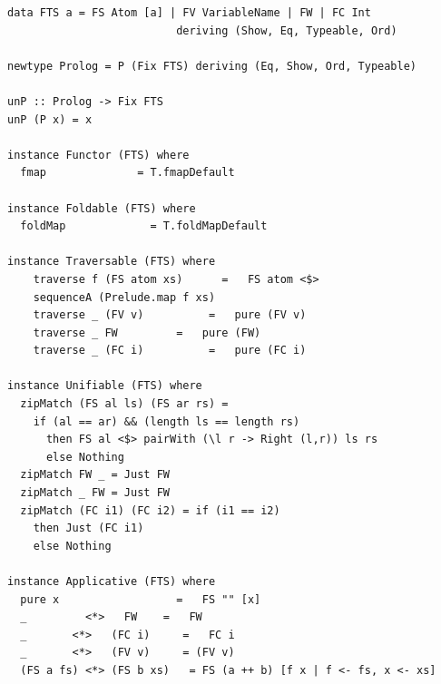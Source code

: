 \documentclass[thesis-solanki.tex]{subfiles}
\begin{document}
\begin{verbatim}
data FTS a = FS Atom [a] | FV VariableName | FW | FC Int
                          deriving (Show, Eq, Typeable, Ord)

newtype Prolog = P (Fix FTS) deriving (Eq, Show, Ord, Typeable)

unP :: Prolog -> Fix FTS
unP (P x) = x

instance Functor (FTS) where
  fmap              = T.fmapDefault

instance Foldable (FTS) where
  foldMap             = T.foldMapDefault

instance Traversable (FTS) where
    traverse f (FS atom xs)      =   FS atom <$>
    sequenceA (Prelude.map f xs)
    traverse _ (FV v)          =   pure (FV v)
    traverse _ FW         =   pure (FW)
    traverse _ (FC i)          =   pure (FC i)

instance Unifiable (FTS) where
  zipMatch (FS al ls) (FS ar rs) =
    if (al == ar) && (length ls == length rs)
      then FS al <$> pairWith (\l r -> Right (l,r)) ls rs
      else Nothing
  zipMatch FW _ = Just FW
  zipMatch _ FW = Just FW
  zipMatch (FC i1) (FC i2) = if (i1 == i2)
    then Just (FC i1)
    else Nothing

instance Applicative (FTS) where
  pure x                  =   FS "" [x]
  _         <*>   FW    =   FW
  _       <*>   (FC i)     =   FC i
  _       <*>   (FV v)     = (FV v)
  (FS a fs) <*> (FS b xs)   = FS (a ++ b) [f x | f <- fs, x <- xs]
\end{verbatim}
\end{document}
